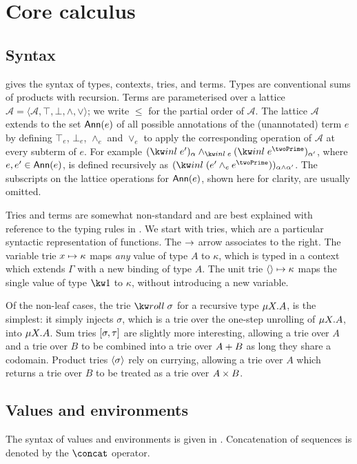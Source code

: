 \section{Core calculus}

\subsection{Syntax}

 gives the syntax of types, contexts, tries, and
terms. Types are conventional sums of products with recursion. Terms are
parameterised over a lattice $\mathcal{A} = \langle \mathcal{A}, \top, \bot,
\wedge, \vee\rangle$; we write $\leq$ for the partial order of $\mathcal{A}$.
The lattice $\mathcal{A}$ extends to the set $\textup{\textsf{Ann}}(e)$ of all possible
annotations of the (unannotated) term $e$ by defining $\top_e$, $\bot_e$,
$\wedge_e$ and $\vee_e$ to apply the corresponding operation of $\mathcal{A}$ at
every subterm of $e$. For example $\annot{(\exInl{e'})}{\alpha}
\wedge_{\exInl{e}} \annot{(\exInl{e^\twoPrime})}{\alpha'}$, where $e, e' \in
\textup{\textsf{Ann}}(e)$, is defined recursively as $\annot{(\exInl{(e' \wedge_e
e^\twoPrime)})}{\alpha \wedge \alpha'}$. The subscripts on the lattice
operations for $\textup{\textsf{Ann}}(e)$, shown here for clarity, are usually omitted.



Tries \cite{hinze00} and terms are somewhat non-standard and are best explained
with reference to the typing rules in
. We start
with tries, which are a particular syntactic representation of functions. The
$\to$ arrow associates to the right. The variable trie
$x \mapsto {\kappa}$ maps \emph{any} value of type $A$ to $\kappa$, which is
typed in a context which extends $\Gamma$ with a new binding of type $A$. The
unit trie $\langle\rangle \mapsto {\kappa}$ maps the single value of type $\tyUnit$ to
$\kappa$, without introducing a new variable.




Of the non-leaf cases, the trie $\trieRoll{\sigma}$ for a recursive type
$\mu{X}.{A}$, is the simplest: it simply injects $\sigma$, which is a
trie over the one-step unrolling of $\mu{X}.{A}$, into
$\mu{X}.{A}$. Sum tries $[\sigma,\tau]$ are slightly more
interesting, allowing a trie over $A$ and a trie over $B$ to be combined into a
trie over ${A}+{B}$ as long they share a codomain. Product tries
${\langle\sigma\rangle}$ rely on currying, allowing a trie over $A$ which returns a
trie over $B$ to be treated as a trie over ${A}\times{B}$.

\subsection{Values and environments}




The syntax of values and environments is given in
. Concatenation of sequences is denoted by
the $\concat$ operator.
